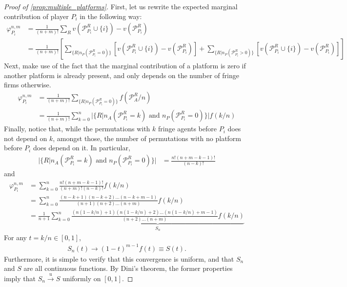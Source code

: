 \documentclass[a4paper]{article}
\begin{document}
\begin{proof}[Proof of \cref{prop:multiple_platforms}]
    \label{prop:one_sided_multiple}
    First, let us rewrite the expected marginal contribution of player $P_i$ in the following way:
    \begin{align*}
        \varphi_{P_i}^{n, m} &= \frac{1}{(n+m)!} \sum_R v(\mathcal{P}_{P_i}^R \cup \{i\}) - v(\mathcal{P}_{P_i}^R) \\
        &= \frac{1}{(n+m)!} \left[ \sum_{\{R | n_P(\mathcal{P}_{P_i}^R = 0)\}} \left[v(\mathcal{P}_{P_i}^R \cup \{i\}) - v(\mathcal{P}_{P_i}^R)\right] + \sum_{\{R | n_P(\mathcal{P}_{P_i}^R > 0)\}} \left[v(\mathcal{P}_{P_i}^R \cup \{i\}) - v(\mathcal{P}_{P_i}^R)\right] \right]
    \end{align*}
    Next, make use of the fact that the marginal contribution of a platform is zero if another platform is already present, and only depends on the number of fringe firms otherwise.
    \begin{align*}
        \varphi_{P_i}^{n, m} &= \frac{1}{(n+m)!} \sum_{\{R | n_P(\mathcal{P}_{P_i}^R = 0)\}} f (\mathcal{P}_{A}^R / n) \\
        &= \frac{1}{(n+m)!} \sum_{k=0}^n |\{R | n_A(\mathcal{P}^R_{P_i} = k) \text{ and } n_P(\mathcal{P}^R_{P_i} = 0)\}| f(k/n)
    \end{align*}
    Finally, notice that, while the permutations with $k$ fringe agents before $P_i$ does not depend on $k$, amongst those, the number of permutations with no platform before $P_i$ does depend on it.
    In particular,
    \begin{align*}
        |\{R | n_A(\mathcal{P}^R_{P_i} = k) \text{ and } n_P(\mathcal{P}^R_{P_i} = 0)\}| &= \frac{n!(n+m-k-1)!}{(n-k)!}
    \end{align*}
    and
    \begin{align*}
        \varphi_{P_i}^{n, m} &= \sum_{k=0}^n \frac{n!(n+m-k-1)!}{(n+m)!(n-k)!} f(k/n) \\
        &= \sum_{k=0}^n \frac{(n-k+1)(n-k+2) \dots (n-k+m-1)}{(n+1)(n+2) \dots (n+m)} f(k/n) \\
        &= \frac{1}{n+1}\sum_{k=0}^n \underbrace{\frac{(n(1-k/n)+1)(n(1-k/n)+2) \dots (n(1-k/n)+m-1)}{(n+2) \dots (n+m)} f(k/n)}_{S_n}
    \end{align*}
    For any $t = k/n \in [0, 1]$, 
    \begin{align*}
        S_n(t) \to (1-t)^{m-1}f(t) \equiv S(t).
    \end{align*}
    Furthermore, it is simple to verify that this convergence is uniform, and that $S_n$ and $S$ are all continuous functions.
    By Dini's theorem, the former properties imply that $S_n \xrightarrow[]{\mathrm{u}} S$ uniformly on $[0, 1]$.


\end{proof}
\end{document}
